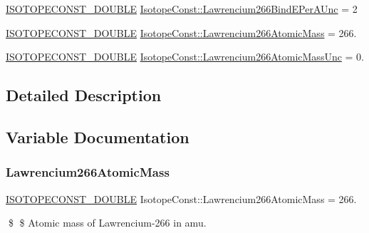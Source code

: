 \begin{DoxyCompactItemize}
\mbox{\hyperlink{group___isotope_const-_macros_ga8f45a7272ce02c0b4c65c44636ed719a}{I\+S\+O\+T\+O\+P\+E\+C\+O\+N\+S\+T\+\_\+\+D\+O\+U\+B\+LE}} \mbox{\hyperlink{group___isotope_const-_lawrencium-_lr266_gaeffad645a731b55aef92353dbb99c759}{Isotope\+Const\+::\+Lawrencium266\+Bind\+E\+Per\+A\+Unc}} = 2
\item 
\mbox{\hyperlink{group___isotope_const-_macros_ga8f45a7272ce02c0b4c65c44636ed719a}{I\+S\+O\+T\+O\+P\+E\+C\+O\+N\+S\+T\+\_\+\+D\+O\+U\+B\+LE}} \mbox{\hyperlink{group___isotope_const-_lawrencium-_lr266_gaa029dbf50d7036bd47de60583d14cf14}{Isotope\+Const\+::\+Lawrencium266\+Atomic\+Mass}} = 266.
\item 
\mbox{\hyperlink{group___isotope_const-_macros_ga8f45a7272ce02c0b4c65c44636ed719a}{I\+S\+O\+T\+O\+P\+E\+C\+O\+N\+S\+T\+\_\+\+D\+O\+U\+B\+LE}} \mbox{\hyperlink{group___isotope_const-_lawrencium-_lr266_gab6df8e5aed8142db666474da60fb1b3b}{Isotope\+Const\+::\+Lawrencium266\+Atomic\+Mass\+Unc}} = 0.
\end{DoxyCompactItemize}


\subsection{Detailed Description}


\subsection{Variable Documentation}
\mbox{\label{group___isotope_const-_lawrencium-_lr266_gaa029dbf50d7036bd47de60583d14cf14}} 
\subsubsection{\texorpdfstring{Lawrencium266\+Atomic\+Mass}{Lawrencium266AtomicMass}}
{\footnotesize\ttfamily \mbox{\hyperlink{group___isotope_const-_macros_ga8f45a7272ce02c0b4c65c44636ed719a}{I\+S\+O\+T\+O\+P\+E\+C\+O\+N\+S\+T\+\_\+\+D\+O\+U\+B\+LE}} Isotope\+Const\+::\+Lawrencium266\+Atomic\+Mass = 266.}

\$ \$ Atomic mass of Lawrencium-\/266 in amu. \mbox{\label{group___isotope_const-_lawrencium-_lr266_gab6df8e5aed8142db666474da60fb1b3b}} 

